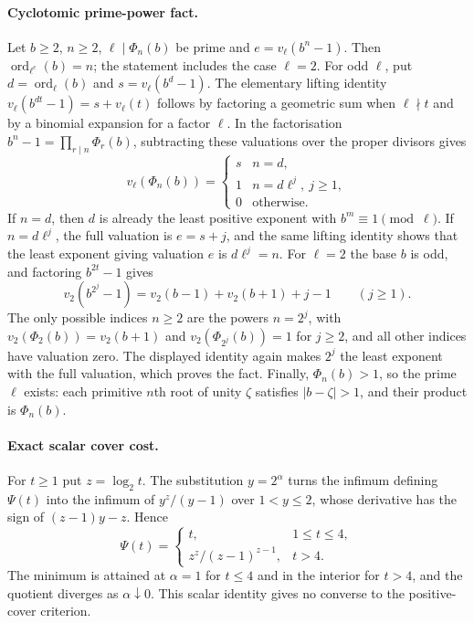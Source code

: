 \documentclass[11pt]{article}
\begin{document}
\paragraph{Cyclotomic prime-power fact.}
Let $b\ge2$, $n\ge2$, $\ell\mid\Phi_n(b)$ be prime and
$e=v_\ell(b^n-1)$. Then $\operatorname{ord}_{\ell^e}(b)=n$; the
statement includes the case $\ell=2$. For odd $\ell$, put
$d=\operatorname{ord}_{\ell}(b)$ and $s=v_\ell(b^d-1)$. The elementary
lifting identity $v_\ell(b^{dt}-1)=s+v_\ell(t)$ follows by factoring a
geometric sum when $\ell\nmid t$ and by a binomial expansion for a
factor $\ell$. In the factorisation $b^n-1=\prod_{r\mid n}\Phi_r(b)$,
subtracting these valuations over the proper divisors gives
\[
 v_\ell(\Phi_n(b))=
 \begin{cases}s&n=d,\\1&n=d\ell^j,\ j\ge1,\\0&\text{otherwise.}\end{cases}
\]
If $n=d$, then $d$ is already the least positive exponent with
$b^m\equiv1\pmod\ell$. If $n=d\ell^j$, the full valuation is $e=s+j$,
and the same lifting identity shows that the least exponent giving
valuation $e$ is $d\ell^j=n$. For $\ell=2$ the base $b$ is odd, and
factoring $b^{2t}-1$ gives
\[
 v_2(b^{2^j}-1)=v_2(b-1)+v_2(b+1)+j-1\qquad(j\ge1).
\]
The only possible indices $n\ge2$ are the powers $n=2^j$, with
$v_2(\Phi_2(b))=v_2(b+1)$ and $v_2(\Phi_{2^j}(b))=1$ for $j\ge2$, and
all other indices have valuation zero. The displayed identity again
makes $2^j$ the least exponent with the full valuation, which proves
the fact. Finally, $\Phi_n(b)>1$, so the prime $\ell$ exists: each
primitive $n$th root of unity $\zeta$ satisfies $|b-\zeta|>1$, and
their product is $\Phi_n(b)$.

\paragraph{Exact scalar cover cost.}
For $t\ge1$ put $z=\log_2t$. The substitution $y=2^\alpha$ turns the
infimum defining $\Psi(t)$ into the infimum of $y^z/(y-1)$ over
$1<y\le2$, whose derivative has the sign of $(z-1)y-z$. Hence
\[
 \Psi(t)=
 \begin{cases}t,&1\le t\le4,\\
 z^z/(z-1)^{z-1},&t>4.
 \end{cases}
\]
The minimum is attained at $\alpha=1$ for $t\le4$ and in the interior
for $t>4$, and the quotient diverges as $\alpha\downarrow0$. This
scalar identity gives no converse to the positive-cover criterion.
\end{document}
